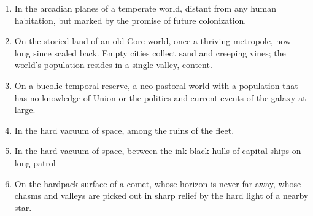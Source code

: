 \begin{enumerate}
    \item In the arcadian planes of a temperate world, distant from any human habitation, but marked by the promise of future colonization.
    \item On the storied land of an old Core world, once a thriving metropole, now long since scaled back. Empty cities collect sand and creeping vines; the world’s population resides in a single valley, content.
    \item On a bucolic temporal reserve, a neo-pastoral world with a population that has no knowledge of Union or the politics and current events of the galaxy at large.
    \item In the hard vacuum of space, among the ruins of the fleet.
    \item In the hard vacuum of space, between the ink-black hulls of capital ships on long patrol
    \item On the hardpack surface of a comet, whose horizon is never far away, whose chasms and valleys are picked out in sharp relief by the hard light of a nearby star.
\end{enumerate}

